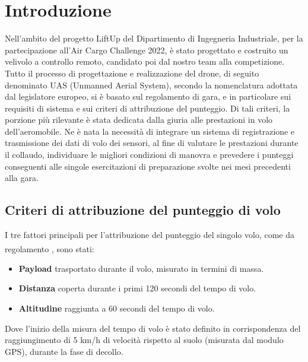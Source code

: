 \documentclass[12pt]{article}
\begin{document}
\section*{Introduzione}
Nell'ambito del progetto LiftUp del Dipartimento di Ingegneria Industriale, per la partecipazione all'Air Cargo Challenge 2022, è stato progettato e costruito un velivolo a controllo remoto, candidato poi dal nostro team alla competizione.
Tutto il processo di progettazione e realizzazione del drone, di seguito denominato UAS (Unmanned Aerial System), secondo la nomenclatura adottata dal legislatore europeo, si è basato sul regolamento di gara, e in particolare sui requisiti di sistema e sui criteri di attribuzione del punteggio. Di tali criteri, la porzione più rilevante è stata dedicata dalla giuria alle prestazioni in volo dell'aeromobile. Ne è nata la necessità di integrare un sistema di registrazione e trasmissione dei dati di volo dei sensori, al fine di valutare le prestazioni durante il collaudo, individuare le migliori condizioni di manovra e prevedere i punteggi conseguenti alle singole esercitazioni di preparazione svolte nei mesi precedenti alla gara.

\subsection*{Criteri di attribuzione del punteggio di volo}
I tre fattori principali per l'attribuzione del punteggio del singolo volo, come da regolamento \textsuperscript{\cite{regulation}}, sono stati:
\begin{itemize}
\item \textbf{Payload} trasportato durante il volo, misurato in termini di massa.
\item \textbf{Distanza} coperta durante i primi 120 secondi del tempo di volo.
\item \textbf{Altitudine} raggiunta a 60 secondi del tempo di volo.
\end{itemize}
Dove l'inizio della misura del tempo di volo è stato definito in corrispondenza del raggiungimento di 5 km/h di velocità rispetto al suolo (misurata dal modulo GPS), durante la fase di decollo.

\newpage


\end{document}
